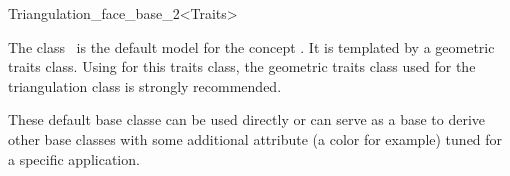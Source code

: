 

\begin{ccRefClass}{Triangulation_face_base_2<Traits>}  %

\ccDefinition
  
The class \ccRefName\ is the default  model for the concept
.
It is  templated by a geometric traits class.
Using for this traits class, the geometric traits class used for the triangulation class
is strongly recommended. 

These default base classe can be used directly or can serve as a base to derive
other base classes with some additional attribute (a color for example)
tuned for a specific application.


\ccIsModel
{}

\ccSeeAlso








\end{ccRefClass}


